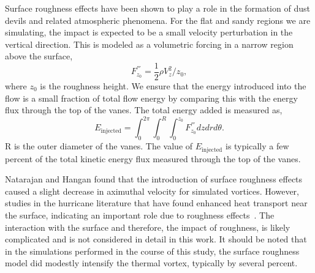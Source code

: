 
Surface roughness effects have been shown to play a role in the
formation of dust devils and related atmospheric
phenomena\cite{oke1987boundary}. For the flat and sandy
regions we are simulating, the impact is expected to be a small velocity
perturbation  in the vertical direction. This is modeled as a volumetric
forcing in a narrow region above the surface, 
\begin{equation}
 F^{'''}_{z_0} = \frac{1}{2}\rho V_z^2/z_{0}, 
\end{equation}
where $z_{0}$ is the roughness height. We ensure that the energy
introduced into the flow is a small fraction of total flow energy by comparing
this with the energy flux through the top of the vanes. The total energy
added is measured as,  
\begin{equation}
 E_{\text{injected}} = \int_0^{2\pi} \int_0^R \int_0^{z_0} F^{'''}_{z_0}
  dz dr d\theta.  
\end{equation}
R is the outer diameter of the vanes. 
The value of $E_{\text{injected}}$ is typically a few percent of the
total kinetic energy flux measured through the top of the
vanes.

Natarajan and Hangan\cite{Natarajan2012577} found that the introduction
of surface roughness effects caused a slight decrease in aximuthal
velocity for simulated vortices. However, studies in the hurricane
literature that have found enhanced heat transport near the surface,
indicating an important role due to roughness
effects~\cite{Zeng2010,GRL:GRL50047,hurricane_drag}. The interaction
with the surface and therefore, the impact of roughness, is likely
complicated and is not considered in detail in this work. It should be 
noted that in the simulations performed in the course of this study, the
surface roughness model did modestly intensify the thermal vortex,
typically by several percent.  


